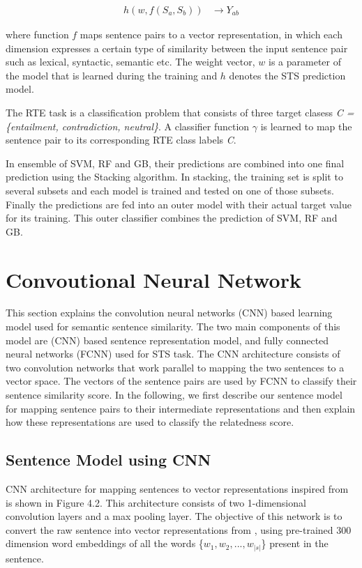 \documentclass[12pt]{report} %
\begin{document}
	\begin{align} 
	h(w,f(S_a,S_b))  & \rightarrow Y_{ab} 
	\end{align}
	
	where function $f$ maps sentence pairs to a vector
	representation, in which each dimension expresses a certain type of
	similarity between the input sentence pair such as lexical, syntactic, semantic etc. The weight vector,
	$w$ is a parameter of the model that is learned during the training and $h$ denotes the STS prediction model.
	
	The RTE task is a classification problem that consists of three target clasess  \textit{ C =\{entailment, contradiction, neutral\}}. A classifier function $\gamma$ is learned to map the sentence pair to its corresponding RTE class labels \textit{C}.
	
	In ensemble of SVM, RF and GB, their predictions are combined into one final prediction using the Stacking algorithm. In stacking, the training set is split to several subsets and each model is trained and tested on one of those subsets. Finally the predictions are fed into an outer model with their actual target value for its training. This outer classifier combines the prediction of SVM, RF and GB.
	
	
\section{Convoutional Neural Network}
	This section explains the convolution neural networks (CNN) based learning model used for semantic sentence similarity. The two main components of this model are (CNN) based sentence representation model, and fully connected neural networks (FCNN) used for STS task. The CNN architecture consists of two convolution networks that work parallel to mapping the two sentences to a vector space. The vectors of the sentence pairs are used by FCNN to classify their sentence similarity score. In the following, we first describe our sentence model for mapping sentence pairs to their intermediate representations and then explain how these representations are used to classify the relatedness score.
	
	\subsection{Sentence Model using CNN}
	CNN architecture for mapping sentences to
	vector representations inspired from \cite{shao2017hcti} is shown in Figure 4.2. This architecture consists of two 1-dimensional convolution layers and a max pooling layer. The objective of this network is to convert the raw sentence into vector representations from \cite{pennington2014glove}, using pre-trained 300 dimension word embeddings of all the words \{$w_{1}, w_{2},...,w_{|s|}$\} present in the sentence.
	
\end{document}

